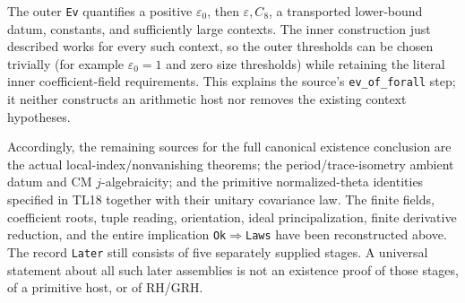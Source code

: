 The outer \texttt{Ev} quantifies a positive $\varepsilon_0$, then
$\varepsilon,C_8$, a transported lower-bound datum, constants,
and sufficiently large contexts. The inner construction just
described works for every such context, so the outer thresholds
can be chosen trivially (for example $\varepsilon_0=1$ and
zero size thresholds) while retaining the literal inner
coefficient-field requirements. This explains the source's
\texttt{ev\_of\_forall} step; it neither constructs an arithmetic
host nor removes the existing context hypotheses.

Accordingly, the remaining sources for the full canonical
existence conclusion are the actual local-index/nonvanishing
theorems; the period/trace-isometry ambient datum and CM
$j$-algebraicity; and the primitive normalized-theta identities
specified in TL18 together with their unitary covariance law.
The finite fields, coefficient roots, tuple reading, orientation,
ideal principalization, finite derivative reduction, and the
entire implication \texttt{Ok}$\Rightarrow$\texttt{Laws} have
been reconstructed above. The record \texttt{Later} still
consists of five separately supplied stages. A universal
statement about all such later assemblies is not an existence
proof of those stages, of a primitive host, or of RH/GRH.

